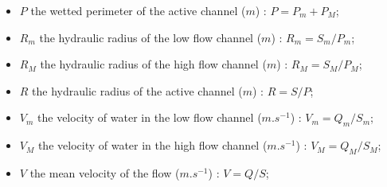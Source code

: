 \begin{itemize}
 \item $P$ the wetted perimeter of the active channel ($m$) : $P = P_m + P_M$;
\vspace{0.5cm}
 \item $R_m$ the hydraulic radius of the low flow channel ($m$) : $R_m = S_m / P_m$;
 \item $R_M$ the hydraulic radius of the high flow channel ($m$) : $R_M = S_M / P_M$;
 \item $R$ the hydraulic radius of the active channel ($m$) : $R = S / P$;
\vspace{0.5cm}
 \item $V_m$ the velocity of water in the low flow channel ($m.s^{-1}$) : $V_m = Q_m / S_m$;
 \item $V_M$ the velocity of water in the high flow channel ($m.s^{-1}$) : $V_M = Q_M / S_M$;
 \item $V$ the mean velocity of the flow ($m.s^{-1}$) : $V = Q / S$;
\end{itemize}

\vspace{0.5cm}